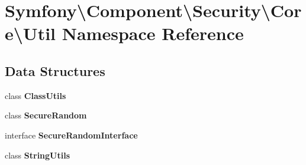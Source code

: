\section{Symfony\textbackslash{}Component\textbackslash{}Security\textbackslash{}Core\textbackslash{}Util Namespace Reference}
\label{namespace_symfony_1_1_component_1_1_security_1_1_core_1_1_util}
\subsection*{Data Structures}
\begin{DoxyCompactItemize}
\item 
class {\bf Class\+Utils}
\item 
class {\bf Secure\+Random}
\item 
interface {\bf Secure\+Random\+Interface}
\item 
class {\bf String\+Utils}
\end{DoxyCompactItemize}

